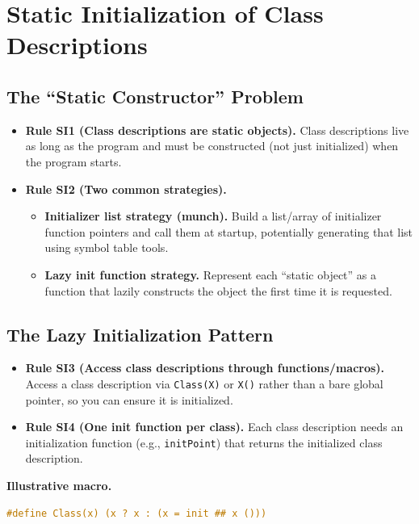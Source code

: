 \documentclass[11pt]{article}
\begin{document}
\section{Static Initialization of Class Descriptions}

\subsection{The ``Static Constructor'' Problem}

\begin{itemize}
  \item \textbf{Rule SI1 (Class descriptions are static objects).} Class descriptions live as long as the program and must be constructed (not just initialized) when the program starts.
  \item \textbf{Rule SI2 (Two common strategies).}
  \begin{itemize}
    \item \textbf{Initializer list strategy (munch).} Build a list/array of initializer function pointers and call them at startup, potentially generating that list using symbol table tools.
    \item \textbf{Lazy init function strategy.} Represent each ``static object'' as a function that lazily constructs the object the first time it is requested.
  \end{itemize}
\end{itemize}

\subsection{The Lazy Initialization Pattern}

\begin{itemize}
  \item \textbf{Rule SI3 (Access class descriptions through functions/macros).} Access a class description via \texttt{Class(X)} or \texttt{X()} rather than a bare global pointer, so you can ensure it is initialized.
  \item \textbf{Rule SI4 (One init function per class).} Each class description needs an initialization function (e.g., \texttt{initPoint}) that returns the initialized class description.
\end{itemize}

\noindent\textbf{Illustrative macro.}
\begin{lstlisting}[language=C]
#define Class(x) (x ? x : (x = init ## x ()))
\end{lstlisting}
\end{document}
